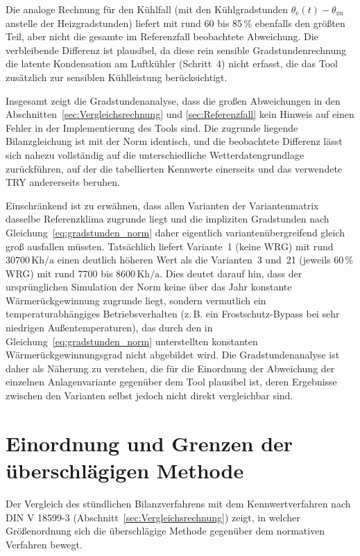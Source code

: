 \documentclass{scrreprt}
\begin{document}
Die analoge Rechnung für den Kühlfall (mit den Kühlgradstunden
$\theta_{\mathrm{e}}(t)-\theta_{\mathrm{zu}}$ anstelle der
Heizgradstunden) liefert mit rund \num{60} bis \num{85}\,\% ebenfalls den
größten Teil, aber nicht die gesamte im Referenzfall beobachtete
Abweichung. Die verbleibende Differenz ist plausibel, da diese rein
sensible Gradstundenrechnung die latente Kondensation am Luftkühler
(Schritt~4) nicht erfasst, die das Tool zusätzlich zur sensiblen
Kühlleistung berücksichtigt.

Insgesamt zeigt die Gradstundenanalyse, dass die großen Abweichungen
in den Abschnitten~\ref{sec:Vergleichsrechnung} und
\ref{sec:Referenzfall} kein Hinweis auf einen Fehler in der
Implementierung des Tools sind. Die zugrunde liegende Bilanzgleichung
ist mit der Norm identisch, und die beobachtete Differenz lässt sich
nahezu vollständig auf die unterschiedliche Wetterdatengrundlage
zurückführen, auf der die tabellierten Kennwerte einerseits und das
verwendete \ac{TRY} andererseits beruhen.

Einschränkend ist zu erwähnen, dass allen Varianten der
Variantenmatrix dasselbe Referenzklima zugrunde liegt und die
impliziten Gradstunden nach Gleichung~\eqref{eq:gradstunden_norm}
daher eigentlich variantenübergreifend gleich groß ausfallen müssten.
Tatsächlich liefert Variante~1 (keine WRG) mit rund
$30700\,\mathrm{Kh/a}$ einen deutlich höheren Wert als die Varianten~3
und~21 (jeweils $60\,\%$ WRG) mit rund $7700$ bis
$8600\,\mathrm{Kh/a}$. Dies deutet darauf hin, dass der ursprünglichen
Simulation der Norm keine über das Jahr konstante Wärmerückgewinnung
zugrunde liegt, sondern vermutlich ein temperaturabhängiges
Betriebsverhalten (z.\,B. ein Frostschutz-Bypass bei sehr niedrigen
Außentemperaturen), das durch den in
Gleichung~\eqref{eq:gradstunden_norm} unterstellten konstanten
Wärmerückgewinnungsgrad nicht abgebildet wird. Die Gradstundenanalyse
ist daher als Näherung zu verstehen, die für die Einordnung der
Abweichung der einzelnen Anlagenvariante gegenüber dem Tool
plausibel ist, deren Ergebnisse zwischen den Varianten selbst jedoch
nicht direkt vergleichbar sind.

\section{Einordnung und Grenzen der überschlägigen Methode}
Der Vergleich des stündlichen Bilanzverfahrens mit dem
Kennwertverfahren nach DIN V 18599-3 (Abschnitt~\ref{sec:Vergleichsrechnung})
zeigt, in welcher Größenordnung sich die überschlägige Methode
gegenüber dem normativen Verfahren bewegt.
\end{document}
